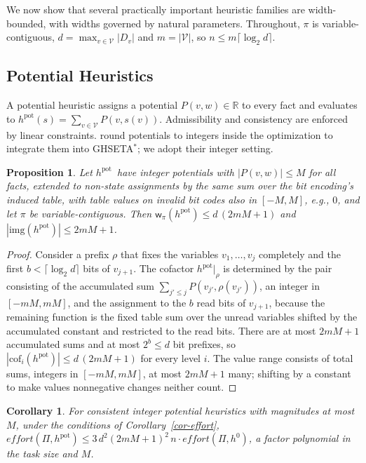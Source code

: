 \documentclass[letterpaper]{article}
\newcommand{\task}{\ensuremath{\Pi}}
\newcommand{\vars}{\ensuremath{\mathcal{V}}}
\newcommand{\hblind}{\ensuremath{h^{0}}}
\newcommand{\hpot}{\ensuremath{h^{\text{pot}}}}
\newcommand{\width}{\ensuremath{\mathsf{w}}}
\newcommand{\effort}{\ensuremath{\mathit{effort}}}
\newcommand{\sub}[2]{\ensuremath{\mathrm{cof}_{#1}(#2)}}
\newcommand{\img}{\ensuremath{\mathrm{img}}}
\newcommand{\ghseta}{GHSETA\ensuremath{^{*}}}
\theoremstyle{plain}
\newtheorem{proposition}{Proposition}
\newtheorem{corollary}{Corollary}
\theoremstyle{definition}
\theoremstyle{remark}
\begin{document}
We now show that several practically important heuristic families are
width-bounded, with widths governed by natural parameters. Throughout,
$\pi$ is variable-contiguous, $d = \max_{v \in \vars} |D_v|$ and
$m = |\vars|$, so $n \leq m \lceil \log_2 d \rceil$.

\subsection{Potential Heuristics}

A potential heuristic \citep{pommerening-et-al-aaai2015} assigns a
potential $P(v, w) \in \mathbb{R}$ to every fact and evaluates to
$\hpot(s) = \sum_{v \in \vars} P(v, s(v))$. Admissibility and
consistency are enforced by linear constraints.
\citet{fiser-et-al-aaai2022} round potentials to integers inside the
optimization to integrate them into \ghseta; we adopt their integer
setting.

\begin{proposition}
\label{prop-pot}
Let \hpot\ have integer potentials with $|P(v,w)| \leq M$ for all
facts, extended to non-state assignments by the same sum over the bit
encoding's induced table, with table values on invalid bit codes also
in $[-M, M]$, e.g., $0$, and let $\pi$ be variable-contiguous. Then
$\width_\pi(\hpot) \leq d \, (2mM + 1)$ and
$|\img(\hpot)| \leq 2mM + 1$.
\end{proposition}

\begin{proof}
Consider a prefix $\rho$ that fixes the variables
$v_1, \dots, v_j$ completely and the first $b < \lceil \log_2 d \rceil$
bits of $v_{j+1}$. The cofactor $\hpot|_\rho$ is determined by the pair
consisting of the accumulated sum
$\sum_{j' \leq j} P(v_{j'}, \rho(v_{j'}))$, an integer in
$[-mM, mM]$, and the assignment to the $b$ read bits of $v_{j+1}$,
because the remaining function is the fixed table sum over the
unread variables shifted by the accumulated constant and restricted to
the read bits. There are at most $2mM + 1$ accumulated sums and at most
$2^{b} \leq d$ bit prefixes, so
$|\sub{i}{\hpot}| \leq d\,(2mM + 1)$ for every level $i$. The value
range consists of total sums, integers in $[-mM, mM]$, at most
$2mM + 1$ many; shifting by a constant to make values nonnegative
changes neither count.
\end{proof}

\begin{corollary}
\label{cor-pot}
For consistent integer potential heuristics with magnitudes at most
$M$, under the conditions of Corollary~\ref{cor-effort},
$\effort(\task, \hpot) \leq
3\, d^{2} (2mM + 1)^{2}\, n \cdot \effort(\task, \hblind)$,
a factor polynomial in the task size and $M$.
\end{corollary}
\end{document}
